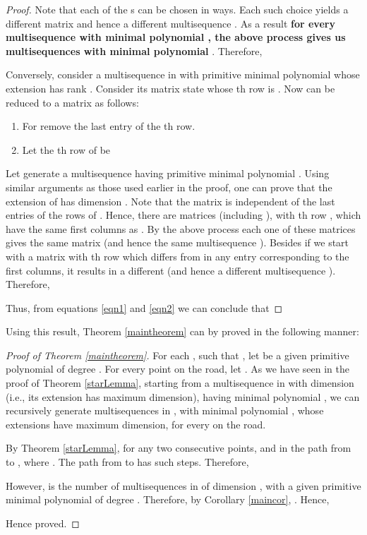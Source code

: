 \documentclass[letterpaper, 12 pt]{article}  \usepackage{amssymb}
\begin{document}
\begin{proof}
Note that each of the s can be chosen in
 ways. Each such choice yields a different matrix  and hence a
different multisequence . As a
result {\bf for every multisequence  with minimal polynomial ,
the above process gives us 
multisequences  with minimal polynomial }. 
Therefore, 


Conversely, consider a multisequence  in  with primitive minimal
polynomial  whose extension has rank . Consider its matrix state
 whose th row is . Now  can be
reduced to a matrix   as follows:
\begin{enumerate}
 \item For  remove the last entry of the th row.
 \item Let the th row of  be 
\end{enumerate}
 
Let  generate a multisequence  having primitive minimal polynomial . Using similar arguments as those used earlier in the proof, one can prove that
the extension of  has dimension . 
 Note that the matrix  is independent  of  the last entries of the rows of
. Hence, there are  matrices (including ),
 with th row , which have the same first  columns as
 .  By the above process each one of these matrices 
  gives the same matrix  (and hence the same multisequence ).
 Besides if we start with a matrix with th row  which differs
from  in any entry corresponding to the first  columns, it results
in a different  (and hence a different multisequence ). Therefore,
 
 Thus, from equations \eqref{eqn1} and \eqref{eqn2} we can conclude that
 

\end{proof}


Using this result, Theorem \ref{maintheorem} can by proved in the following
manner:
\begin{proof}[Proof of Theorem \ref{maintheorem}]
 For each , such that , let  be a given
 primitive polynomial of degree . For every point 
on the road, let . As we have seen in the proof of
Theorem \ref{starLemma}, starting from a multisequence in  with
dimension
 (i.e., its extension has maximum dimension), having minimal
polynomial , we can recursively generate multisequences in
, with minimal polynomial , whose extensions have
maximum dimension, for every  on the road.

By Theorem \ref{starLemma}, for any two consecutive points,  and  in the path from  to ,
 where .
The path from  to  has  such steps. Therefore,

 However,  is the number of multisequences in
 of dimension , with a given primitive minimal polynomial  of degree
.
Therefore, by Corollary \ref{maincor}, . Hence,

Hence proved.
\end{proof}
\end{document}

